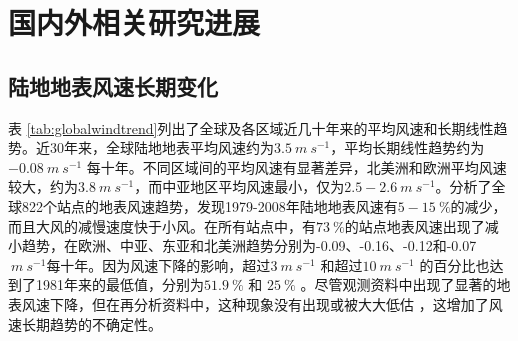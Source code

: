 \section{国内外相关研究进展}

\subsection{陆地地表风速长期变化}

表 \ref{tab:globalwindtrend}列出了全球及各区域近几十年来的平均风速和长期线性趋势。近30年来，全球陆地地表平均风速约为$3.5 ~ m ~ s^{-1}$，平均长期线性趋势约为$-0.08 ~ m ~ s^{-1}$ 每十年。不同区域间的平均风速有显著差异，北美洲和欧洲平均风速较大，约为$ 3.8 ~ m ~ s^{-1}$，而中亚地区平均风速最小，仅为$ 2.5 - 2.6 ~ m ~ s^{-1} $。\citet{vautard2010northern}分析了全球822个站点的地表风速趋势，发现1979-2008年陆地地表风速有$ 5 - 15 ~\%$的减少，而且大风的减慢速度快于小风。在所有站点中，有$ 73 ~ \%$的站点地表风速出现了减小趋势，在欧洲、中亚、东亚和北美洲趋势分别为-0.09、-0.16、-0.12和-0.07 $ ~ m ~ s^{-1} $每十年。因为风速下降的影响，超过$3 ~ m ~ s^{-1}$ 和超过$ 10 ~ m ~ s^{-1}$ 的百分比也达到了1981年来的最低值，分别为$ 51.9 ~ \%$ 和 $25~ \%$ \citep{mcvicar2012land}。尽管观测资料中出现了显著的地表风速下降，但在再分析资料中，这种现象没有出现或被大大低估 \citep{vautard2010northern, stocker2013climate, torralba2017uncertainty}，这增加了风速长期趋势的不确定性。


